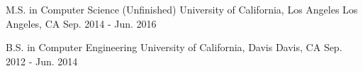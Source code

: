 

\begin{cventries}

  \cventry
    {M.S. in Computer Science \fontsize{7}{12}\selectfont (Unfinished) \fontsize{7}{12}\selectfont} %
    {University of California, Los Angeles} %
    {Los Angeles, CA} %
    {Sep. 2014 - Jun. 2016} %
    {} %
    {}

  \cventry
    {B.S. in Computer Engineering} %
    {University of California, Davis} %
    {Davis, CA} %
    {Sep. 2012 - Jun. 2014} %
    {} %
    {}

\end{cventries}
